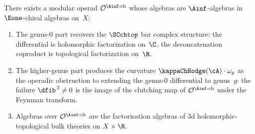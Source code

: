 
\begin{conjecture}
\label{conj:modular-operad-ainf-chiral}
There exists a modular operad $\mathcal{O}^{\Ainf\text{-ch}}$
whose algebras are $\Ainf$-algebras in $\Eone$-chiral algebras
on~$X$:
\begin{enumerate}[label=\textup{(\roman*)}]
\item The genus-$0$ part recovers the $\SCchtop$ bar complex
 structure: the differential is holomorphic factorization
 on~$\C$, the deconcatenation coproduct is topological
 factorization on~$\R$.
\item The higher-genus part produces the curvature
 $\kappaChHodge(\cA) \cdot \omega_g$ as the operadic
 obstruction to extending the genus-$0$ differential to
 genus~$g$: the failure $\dfib^{\,2} \ne 0$ is the image
 of the clutching map of $\mathcal{O}^{\Ainf\text{-ch}}$
 under the Feynman transform.
\item Algebras over $\mathcal{O}^{\Ainf\text{-ch}}$ are the
 factorisation algebras of $3$d holomorphic-topological
 bulk theories on $X \times \R$.
\end{enumerate}
\end{conjecture}

